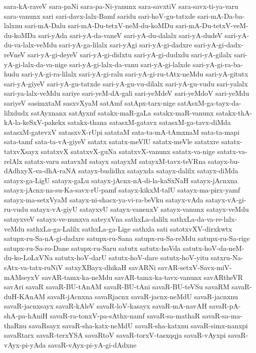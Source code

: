 {sara-kA-raveV
sara-paNi
sara-pa-Ni-yanunx
sara-savxtiV
sara-savx-ti-ya-varu
sara-vanunx
sari
sari-davx-lalx-Bamf
saridu
sari-hoV-gu-tatxde
sari-mA-Da-ba-lalxnu
sari-mA-Dalu
sari-mA-Du-tetxV-neM-du-koMDu
sari-mA-Du-tetxV-veM-du-koMDa
sari-yAda
sari-yA-da-vaneV
sari-yA-du-dalalx
sari-yA-dudeV
sari-yA-du-va-lalx-veMdu
sari-yA-ga-lilalx
sari-yAgi
sari-yA-gi-dadxre
sari-yA-gi-dadx-reVneV
sari-yA-gi-deyeV
sari-yA-gi-didxtu
sari-yA-gi-dudxdu
sari-yA-gilalx
sari-yA-gi-lalx-da-va-nige
sari-yA-gi-lalx-da-vanu
sari-yA-gi-lalxde
sari-yA-gi-ra-ba-hudu
sari-yA-gi-ra-lilalx
sari-yA-gi-ralu
sari-yA-gi-ru-tAtx-neMdu
sari-yA-gitutx
sari-yA-giyeV
sari-yA-gu-tatxde
sari-yA-gu-vu-dilalx
sari-yA-gu-vudu
sari-yalalx
sari-ya-lalx-veMdu
sariye
sari-yeM-dA-gali
sari-yeMdeV
sari-yeMdoV
sari-yeMdu
sariyeV
sasimxtaM
sasxvXyaM
satAmf
satApx-tarx-nige
satAsxM-ga-tayx-da-lilxdudx
satAyxnanx
satAyxnf
satakx-maR-gaLa
satakx-maR-vanunx
satakx-thA-kA-la-keSxV-pakekx
satakx-thana
satasxM-gatavx
satasxM-ga-tavx-diMda
satasxM-gatevxV
satasxvX-rUpi
satataM
sata-ta-mA-tAmxnaM
sata-ta-mapi
sata-tamf
sata-ta-vA-giyeV
satatx
satatx-meVlU
satatx-meVle
satatxre
satatx-tatxvXsayx
satatxvX
satatxvX-guNa
satatxvX-vanunx
satatx-va-nige
satatx-va-relAlx
satatx-varu
satavxM
satayx
satayxM
satayxM-tavx-teVRna
satayx-bu-dAdhxyX-va-dhA-raNA
satayx-budidhx
satayxda
satayx-dalilx
satayx-diMda
satayx-ga-LigU
satayx-gaLu
satayx-jAcnx-nA-di-la-kaSxNaH
satayx-jAcnxna
satayx-jAcnx-na-su-Ka-savx-rU-pamf
satayx-kikxM-talU
satayx-ma-pirx-yamf
satayx-ma-setxVyaM
satayx-ni-shacx-ya-vi-ra-beVku
satayx-vAda
satayx-vA-gi-ru-vudu
satayx-vA-giyU
satayxvU
satayx-vanenxV
satayx-vanunx
satayx-veMdu
satayxveV
satayx-ve-nunxva
sateyxVna
sathxLa-dalilx
sathxLa-da-va-re-lalx-veMdu
sathxLa-ga-Lalilx
sathxLa-ga-Lige
sathxla
sati
satotxvXV-dirxkwtx
satupx-ru-Sa-nA-gi-dadxre
satupx-ru-Sana
satupx-ru-Sa-reMdu
satupx-ru-Sa-rige
satupx-ru-Sa-ro-Dane
satupx-ru-Saru
satutx
satutx-hoVda
satutx-hoV-da-neM-du-ko-LoLxVNa
satutx-hoV-darU
satutx-hoV-dare
satutx-hoV-yitu
satxru-Na-sAtx-va-tatx-ruNiV
satxyXBayx-dhikaH
savARNi
savAR-setxV-Savx-miV-mAMseyxV
savAR-tamx-ka-neMdu
savAR-tamx-ka-tavx-vanunx
savARtheVR
savAri
savaR
savaR-BU-tAnAM
savaR-BU-tAni
savaR-BU-teVSu
savaRM
savaR-duH-KAnAM
savaR-jAcnxna
savaRjacnx
savaR-jacnx-neMdU
savaR-jacnxnu
savaR-jacnxsayx
savaR-kAleV
savaR-loV-kasayx
savaR-mA-navAH
savaR-pA-shA-pa-hAniH
savaR-ra-tonxV-pa-sAthx-namf
savaR-sa-mathaR
savaR-sa-ma-thaRnu
savaRsayx
savaR-sha-katx-neMdU
savaR-sha-katxnu
savaR-simx-nanxpi
savaRtarx
savaR-terxYSA
savaRtoV
savaR-torxV-tasxqqja
savaR-vAyxpi
savaR-vAyx-pi-yAda
savaR-vAyx-pi-yA-gi-dAdxne
}

